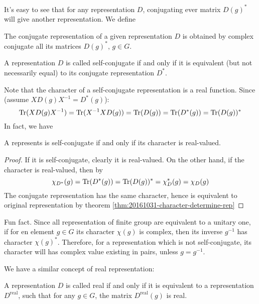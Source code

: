 It's easy to see that for any representation $D$, conjugating ever
matrix $D(g)^*$ will give another representation. We define
\begin{defi}
    The conjugate representation of a given representation $D$ is obtained
    by complex conjugate all its matrices $D(g)^*,\,g\in G$.
\end{defi}
\begin{defi}
    A representation $D$ is called self-conjugate if and only if it is
    equivalent (but not necessarily equal) to its conjugate
    representation $D^*$.
\end{defi}
Note that the character of a self-conjugate representation is a real
function. Since (assume $XD(g)X^{-1}=D^*(g)$):
$$
    \operatorname{Tr}(XD(g)X^{-1}) = \operatorname{Tr}(X^{-1}XD(g)) = \operatorname{Tr}(D(g)) = \operatorname{Tr}(D^*(g))
    = \operatorname{Tr}(D(g))^*
$$
In fact, we have
\begin{thm}
    A represents is self-conjugate if and only if its character is
    real-valued.
\end{thm}
\begin{proof}
    If it is self-conjugate, clearly it is real-valued. On the other
    hand, if the character is real-valued, then by
    \begin{equation}
        \chi_{D^*}(g) = \operatorname{Tr}(D^*(g)) = \operatorname{Tr}(D(g))^* = \chi^*_{D}(g)
        = \chi_{D}(g)
    \end{equation}
    The conjugate representation has the same character, hence is
    equivalent to original representation by theorem \ref{thm:20161031-character-determine-rep}
\end{proof}

Fun fact. Since all representation of finite group are equivalent to a
unitary one, if for en element $g\in G$ its character $\chi(g)$ is
complex, then its inverse $g^{-1}$ has character $\chi(g)^*$.
Therefore, for a representation which is not self-conjugate, its
character will has complex value existing in pairs, unless $g=g^{-1}$.

We have a similar concept of real representation:
\begin{defi}
    A representation $D$ is called real if and only if it is
    equivalent to a representation $D^\text{real}$, such that for any
    $g\in G$, the matrix $D^\text{real}(g)$ is real.
\end{defi}

